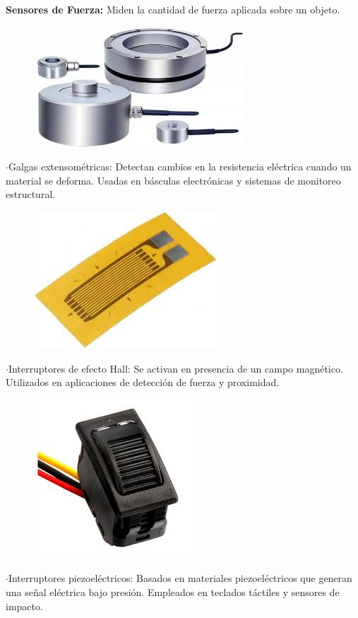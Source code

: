 \textbf{Sensores de Fuerza:}
	Miden la cantidad de fuerza aplicada sobre un objeto.

\begin{figure} [h]
	\centering
	\includegraphics[width=0.3\linewidth]{img/sensorfuerza}
	\caption{}
	\label{fig:sensorfuerza}
\end{figure}

\newpage
	$\cdot$Galgas extensométricas: Detectan cambios en la resistencia eléctrica cuando un material se deforma. Usadas en básculas electrónicas y sistemas de monitoreo estructural.


\begin{figure} [h]
	\centering
	\includegraphics[width=0.3\linewidth]{img/galgasextensiometricas}
	\caption{}
	\label{fig:galgasextensiometricas}
\end{figure}


	$\cdot$Interruptores de efecto Hall: Se activan en presencia de un campo magnético. Utilizados en aplicaciones de detección de fuerza y proximidad.


\begin{figure} [h]
	\centering
	\includegraphics[width=0.3\linewidth]{img/interruptorhall}
	\caption{}
	\label{fig:interruptorhall}
\end{figure}


	$\cdot$Interruptores piezoeléctricos: Basados en materiales piezoeléctricos que generan una señal eléctrica bajo presión. Empleados en teclados táctiles y sensores de impacto.


